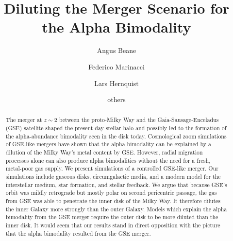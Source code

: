 \documentclass[linenumbers, twocolumn]{aastex631}
\begin{document}
\title{Diluting the Merger Scenario for the Alpha Bimodality}

\author{Angus Beane}

\author{Federico Marinacci}

\author{Lars Hernquist}

\author{others}



\begin{abstract}
  The merger at $z\sim2$ between the proto-Milky Way and the
  Gaia-Sausage-Enceladus (GSE) satellite shaped the present day stellar halo and
  possibly led to the formation of the alpha-abundance bimodality seen in the
  disk today. Cosmological zoom simulations of GSE-like mergers have shown that
  the alpha bimodality can be explained by a dilution of the Milky Way's metal
  content by GSE. However, radial migration processes alone can also produce
  alpha bimodalities without the need for a fresh, metal-poor gas supply. We
  present simulations of a controlled GSE-like merger. Our simulations include
  gaseous disks, circumgalactic media, and a modern model for the interstellar
  medium, star formation, and stellar feedback. We argue that because GSE's
  orbit was mildly retrograde but mostly polar on second pericentric passage,
  the gas from GSE was able to penetrate the inner disk of the Milky Way. It
  therefore dilutes the inner Galaxy more strongly than the outer Galaxy. Models
  which explain the alpha bimodality from the GSE merger require the outer disk
  to be more diluted than the inner disk. It would seem that our results stand
  in direct opposition with the picture that the alpha bimodality resulted from
  the GSE merger.
\end{abstract}
\end{document}
